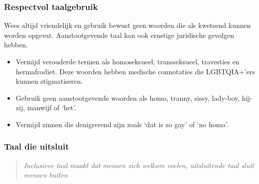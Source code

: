 \documentclass[12pt,openany]{book}
\begin{document}
\subsubsection*{Respectvol taalgebruik}

Wees altijd vriendelijk en gebruik bewust geen woorden die als kwetsend kunnen worden opgevat. Aanstootgevende taal kan ook ernstige juridische gevolgen hebben.

\begin{itemize}
  \item Vermijd verouderde termen als homoseksueel, transseksueel, travesties en hermafrodiet. Deze woorden hebben medische connotaties die LGBTQIA+’ers kunnen stigmatiseren.
  \item Gebruik geen aanstootgevende woorden als homo, tranny, sissy, lady-boy, hij-zij, manwijf of ‘het’.
  \item Vermijd zinnen die denigrerend zijn zoals ‘dat is zo gay’ of ‘no homo’.
\end{itemize}

\subsubsection*{Taal die uitsluit}

\begin{quote}
\textit{Inclusieve taal maakt dat mensen zich welkom voelen, uitsluitende taal sluit mensen buiten}
\end{quote}

\begin{figure}[h]
    \centering
\end{figure}
\end{document}

